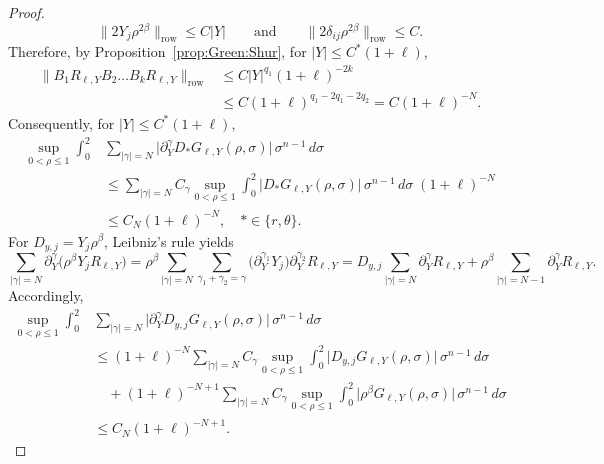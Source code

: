 \documentclass[12pt]{amsart}
\begin{document}
\begin{proof}
\begin{equation*}
    \| 2Y_j \rho^{2\beta}\|_{\mathrm{row}}\le C|Y|
    \qquad\text{and}\qquad
    \| 2 \delta_{ij}\rho^{2\beta}\|_{\mathrm{row}}\le C.
\end{equation*}
Therefore, by Proposition~\ref{prop:Green:Shur}, for $|Y|\le C^*(1+\ell)$,
\begin{align*}
    \bigl\| B_1 R_{\ell,Y} B_2 \dots B_k R_{\ell,Y} \bigr\|_{\mathrm{row}}
    &\le C |Y|^{q_1} (1+\ell)^{-2k}\\
    &\le C (1+\ell)^{q_1-2q_1-2q_2}
    = C (1+\ell)^{-N}.
\end{align*}
Consequently, for $|Y|\le C^*(1+\ell)$,
\begin{align}\label{eq_G_low}
    \sup_{0<\rho\le 1}\int_0^2 &\sum_{|\gamma|=N} \bigl| \partial_Y^\gamma D_* G_{\ell,Y}(\rho,\sigma) \bigr| \, \sigma^{n-1} \, d\sigma \nonumber\\
    &\le \sum_{|\gamma|=N} C_\gamma \sup_{0<\rho\le 1} \int_0^2 \bigl| D_* G_{\ell,Y}(\rho,\sigma) \bigr| \, \sigma^{n-1} \, d\sigma \; (1+\ell)^{-N} \nonumber\\
    &\le C_N (1+\ell)^{-N},\quad *\in \{ r, \theta\}.
\end{align}
For $D_{y,j} = Y_j \rho^\beta$, Leibniz's rule yields
\begin{equation*}
    \sum_{|\gamma|=N}\partial_{Y}^\gamma \bigl( \rho^\beta Y_j R_{\ell,Y} \bigr)
    = \rho^\beta \sum_{|\gamma|=N} \sum_{\gamma_1+\gamma_2 = \gamma} \bigl(\partial_{Y}^{\gamma_1} Y_j\bigr) \partial_Y^{\gamma_2}R_{\ell,Y}
    = D_{y,j} \sum_{|\gamma|=N}\partial_Y^\gamma R_{\ell,Y} + \rho^\beta \sum_{|\gamma|=N-1} \partial_Y^\gamma R_{\ell,Y}.
\end{equation*}
Accordingly,
\begin{align}\label{eq_low_worst}
    \sup_{0<\rho\le 1}\int_0^2 &\sum_{|\gamma|=N} \bigl| \partial_Y^\gamma D_{y,j} G_{\ell,Y}(\rho,\sigma) \bigr| \, \sigma^{n-1} \, d\sigma \nonumber\\
    &\le (1+\ell)^{-N}\sum_{|\gamma|=N} C_\gamma \sup_{0<\rho\le 1} \int_0^2 \bigl| D_{y,j} G_{\ell,Y}(\rho,\sigma) \bigr| \, \sigma^{n-1} \, d\sigma  \nonumber\\
    &\quad+  (1+\ell)^{-N+1}\sum_{|\gamma|=N} C_\gamma \sup_{0<\rho\le 1} \int_0^2 \bigl| \rho^\beta G_{\ell,Y}(\rho,\sigma) \bigr| \, \sigma^{n-1} \, d\sigma \nonumber\\
    &\le C_N (1+\ell)^{-N+1}.
\end{align}


\end{proof}
\end{document}
